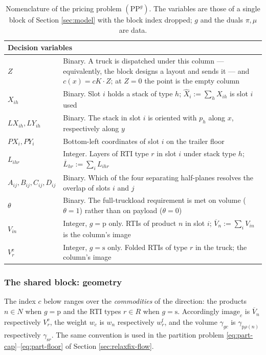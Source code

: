 \begin{longtable}[hbt!]{|p{}|p{}|}
\caption{Nomenclature of the pricing problem $(\mathrm{PP}^{g})$. The
variables are those of a single block of Section \ref{sec:model} with
the block index dropped; $g$ and the duals $\pi,\mu$ are data.}
\label{tab:NomenclaturePricing3D}\\
\hline
\multicolumn{2}{|l|}{\textbf{Decision variables}}\\ \hline
$Z$              & Binary. A truck is dispatched under this column ---
                   equivalently, the block designs a layout and sends it ---
                   and $c(x)=cK\cdot Z$; at $Z=0$ the point is the empty
                   column\\
$X_{ih}$         & Binary. Slot $i$ holds a stack of type $h$;
                   $\widehat{X}_{i}:=\sum_{h}X_{ih}$ is slot $i$ used\\
$\mathit{LX}_{ih},\mathit{LY}_{ih}$ & Binary. The stack in slot $i$ is
                   oriented with $p_{h}$ along $x$, respectively along $y$\\
$\mathit{PX}_{i},\mathit{PY}_{i}$ & Bottom-left coordinates of slot $i$
                   on the trailer floor\\
$L_{ihr}$        & Integer. Layers of RTI type $r$ in slot $i$ under stack
                   type $h$; $\overline{L}_{hr}:=\sum_{i}L_{ihr}$\\
$A_{ij},B_{ij},C_{ij},D_{ij}$ & Binary. Which of the four separating
                   half-planes resolves the overlap of slots $i$ and $j$\\
$\theta$         & Binary. The full-truckload requirement is met on volume
                   ($\theta=1$) rather than on payload ($\theta=0$)\\
$V_{in}$         & Integer, $g=\mathrm{p}$ only. RTIs of product $n$ in slot
                   $i$; $\overline{V}_{n}:=\sum_{i}V_{in}$ is the column's image\\
$V^{\mathrm{e}}_{r}$ & Integer, $g=\mathrm{s}$ only. Folded RTIs of type $r$
                   in the truck; the column's image\\
\hline
\end{longtable}

\subsubsection*{The shared block: geometry}

The index $c$ below ranges over the \emph{commodities} of the
direction: the products $n\in N$ when $g=\mathrm{p}$ and the RTI types
$r\in R$ when $g=\mathrm{s}$. Accordingly $\mathrm{image}_{c}$ is
$\overline{V}_{n}$ respectively $V^{\mathrm{e}}_{r}$, the weight
$w_{c}$ is $w_{n}$ respectively $w^{\mathrm{f}}_{r}$, and the volume
$\gamma_{gc}$ is $\gamma_{\mathrm{p}\rho(n)}$ respectively
$\gamma_{\mathrm{s}r}$. The same convention is used in the partition
problem \eqref{eq:part-cap}--\eqref{eq:part-floor} of Section
\ref{sec:relaxfix-flow}.

